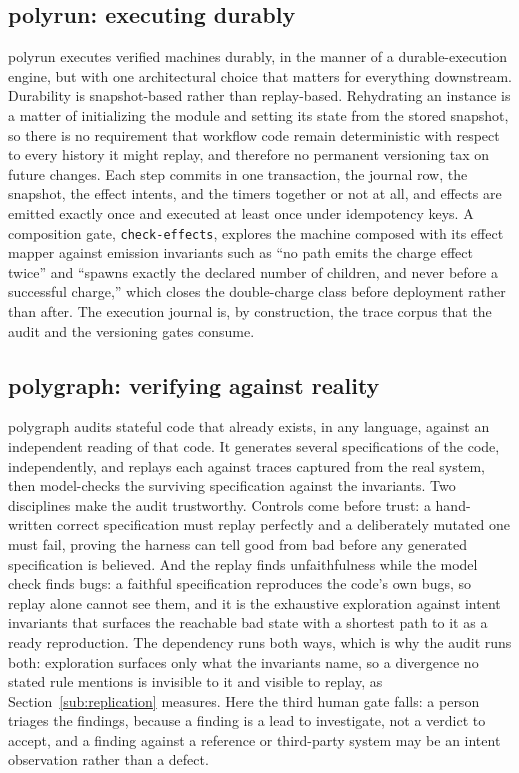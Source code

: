 \documentclass[11pt]{article}
\newcommand{\tool}[1]{\textsf{#1}}
\newcommand{\code}[1]{\texttt{#1}}
\begin{document}
\subsection{\tool{polyrun}: executing durably}

\tool{polyrun} executes verified machines durably, in the manner of a
durable-execution engine, but with one architectural choice that matters for
everything downstream. Durability is snapshot-based rather than replay-based.
Rehydrating an instance is a matter of initializing the module and setting its
state from the stored snapshot, so there is no requirement that workflow code
remain deterministic with respect to every history it might replay, and
therefore no permanent versioning tax on future changes. Each step commits in
one transaction, the journal row, the snapshot, the effect intents, and the
timers together or not at all, and effects are emitted exactly once and
executed at least once under idempotency keys. A composition gate,
\code{check-effects}, explores the machine composed with its effect mapper
against emission invariants such as ``no path emits the charge effect twice''
and ``spawns exactly the declared number of children, and never before a
successful charge,'' which closes the double-charge class before deployment
rather than after. The execution journal is, by construction, the trace corpus
that the audit and the versioning gates consume.

\subsection{\tool{polygraph}: verifying against reality}

\tool{polygraph} audits stateful code that already exists, in any language,
against an independent reading of that code. It generates several specifications
of the code, independently, and replays each against traces captured from the
real system, then model-checks the surviving specification against the
invariants. Two disciplines make the audit trustworthy. Controls come before
trust: a hand-written correct specification must replay perfectly and a
deliberately mutated one must fail, proving the harness can tell good from bad
before any generated specification is believed. And the replay finds
unfaithfulness while the model check finds bugs: a faithful specification
reproduces the code's own bugs, so replay alone cannot see them, and it is the
exhaustive exploration against intent invariants that surfaces the reachable
bad state with a shortest path to it as a ready reproduction. The dependency runs
both ways, which is why the audit runs both: exploration surfaces only what the
invariants name, so a divergence no stated rule mentions is invisible to it and
visible to replay, as Section~\ref{sub:replication} measures. Here the third
human gate falls: a person triages the findings, because a finding is a lead to
investigate, not a verdict to accept, and a finding against a reference or
third-party system may be an intent observation rather than a defect.
\end{document}
